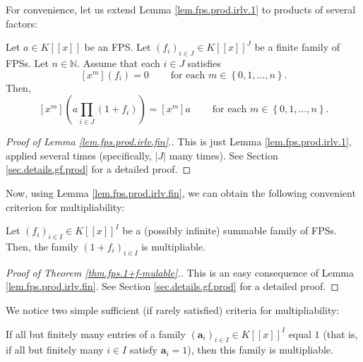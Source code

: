 For convenience, let us extend Lemma \ref{lem.fps.prod.irlv.1} to products of
several factors:

\begin{lemma}
\label{lem.fps.prod.irlv.fin}Let $a\in K\left[  \left[  x\right]  \right]  $
be an FPS. Let $\left(  f_{i}\right)  _{i\in J}\in K\left[  \left[  x\right]
\right]  ^{J}$ be a finite family of FPSs. Let $n\in\mathbb{N}$. Assume that
each $i\in J$ satisfies
\begin{equation}
\left[  x^{m}\right]  \left(  f_{i}\right)  =0\ \ \ \ \ \ \ \ \ \ \text{for
each }m\in\left\{  0,1,\ldots,n\right\}  .
\label{eq.lem.fps.prod.irlv.fin.ass}%
\end{equation}
Then,
\[
\left[  x^{m}\right]  \left(  a\prod_{i\in J}\left(  1+f_{i}\right)  \right)
=\left[  x^{m}\right]  a\ \ \ \ \ \ \ \ \ \ \text{for each }m\in\left\{
0,1,\ldots,n\right\}  .
\]

\end{lemma}

\begin{proof}
[Proof of Lemma \ref{lem.fps.prod.irlv.fin}.]This is just Lemma
\ref{lem.fps.prod.irlv.1}, applied several times (specifically, $\left\vert
J\right\vert $ many times). See Section \ref{sec.details.gf.prod} for a
detailed proof.
\end{proof}

Now, using Lemma \ref{lem.fps.prod.irlv.fin}, we can obtain the following
convenient criterion for multipliability:

\begin{theorem}
\label{thm.fps.1+f-mulable}Let $\left(  f_{i}\right)  _{i\in I}\in K\left[
\left[  x\right]  \right]  ^{I}$ be a (possibly infinite) summable family of
FPSs. Then, the family $\left(  1+f_{i}\right)  _{i\in I}$ is multipliable.
\end{theorem}

\begin{proof}
[Proof of Theorem \ref{thm.fps.1+f-mulable}.]This is an easy consequence of
Lemma \ref{lem.fps.prod.irlv.fin}. See Section \ref{sec.details.gf.prod} for a
detailed proof.
\end{proof}

We notice two simple sufficient (if rarely satisfied) criteria for multipliability:

\begin{proposition}
\label{prop.fps.1-mulable}If all but finitely many entries of a family
$\left(  \mathbf{a}_{i}\right)  _{i\in I}\in K\left[  \left[  x\right]
\right]  ^{I}$ equal $1$ (that is, if all but finitely many $i\in I$ satisfy
$\mathbf{a}_{i}=1$), then this family is multipliable.
\end{proposition}


